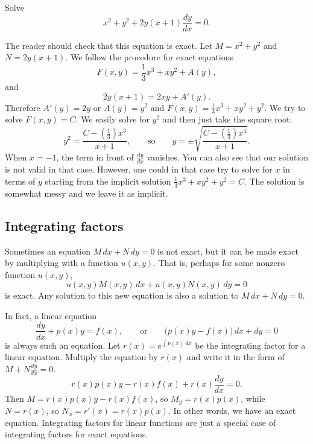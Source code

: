 \documentclass{ximera}
\begin{document}
\begin{example} \label{exact:exampleabove}
    Solve
    \begin{equation*}
        x^2+y^2 + 2y(x+1) \frac{dy}{dx} = 0 .
    \end{equation*}
\end{example}

\begin{exampleSol}
    The reader should check that this equation is exact. Let $M= x^2+y^2$ and $N=2y(x+1)$. We follow the procedure for exact equations
    \begin{equation*}
        F(x,y) = \frac{1}{3}x^3 + xy^2 + A(y) ,
    \end{equation*}
    and
    \begin{equation*}
        2y(x+1) = 2xy + A'(y) .
    \end{equation*}
    Therefore $A'(y) = 2y$ or $A(y) = y^2$ and $F(x,y) = \frac{1}{3}x^3 + xy^2 + y^2$. We try to solve $F(x,y) = C$.  We easily solve for $y^2$ and then just take the square root:
    \begin{equation*}
        y^2 = \frac{C-(\frac{1}{3})x^3}{x+1}, \qquad \text{so} \qquad y = \pm \sqrt{\frac{C-(\frac{1}{3})x^3}{x+1}} .
    \end{equation*}
    When $x=-1$, the term in front of $\frac{dy}{dx}$ vanishes.  You can also see that our solution is not valid in that case.  However, one could in that case try to solve for $x$ in terms of $y$ starting from the implicit solution $\frac{1}{3}x^3 + xy^2 + y^2 = C$.  The solution is somewhat messy and we leave it as implicit.
\end{exampleSol}

\subsection{Integrating factors}

Sometimes an equation $M\, dx + N \, dy = 0$ is not exact, but it can be made exact by multiplying with a function $u(x,y)$.  That is, perhaps for some nonzero function $u(x,y)$,
\begin{equation*}
    u(x,y) M(x,y) \, dx + u(x,y) N(x,y) \, dy = 0
\end{equation*}
is exact.  Any solution to this new equation is also a solution to $M\, dx + N \, dy = 0$.

In fact, a linear equation
\begin{equation*}
    \frac{dy}{dx} + p(x) y = f(x), \qquad \text{or} \qquad \bigl( p(x) y - f(x) \bigr)\, dx +  dy  = 0
\end{equation*}
is always such an equation.  Let $r(x) = e^{\int p(x)\,dx}$ be the integrating factor for a linear equation.  Multiply the equation by $r(x)$ and write it in the form of $M + N \frac{dy}{dx} = 0$.
\begin{equation*}
    r(x) p(x) y - r(x) f(x) + r(x) \frac{dy}{dx} = 0 .
\end{equation*}
Then $M = r(x) p(x) y - r(x) f(x)$, so $M_y = r(x) p(x)$, while $N = r(x)$, so $N_x = r'(x) = r(x) p(x)$.  In other words, we have an exact equation. Integrating factors for linear functions are just a special case of integrating factors for exact equations.
\end{document}
